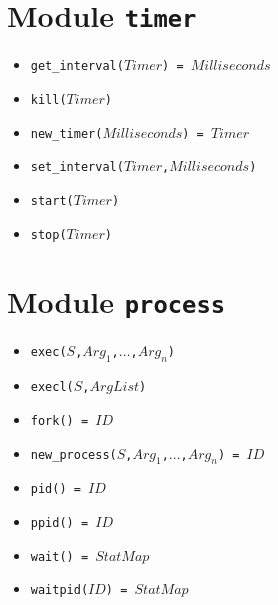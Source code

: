 \documentclass[10pt]{article}
\begin{document}
\begin{multicols}{2}
{\section*{Module \texttt{timer}}
\begin{scriptsize}
\begin{itemize}
    \item \texttt{get\_interval($Timer$) = $Milliseconds$}
    \item \texttt{kill($Timer$)}
    \item \texttt{new\_timer($Milliseconds$) = $Timer$}
    \item \texttt{set\_interval($Timer$,$Milliseconds$)}
    \item \texttt{start($Timer$)}
    \item \texttt{stop($Timer$)}
\end{itemize}
\end{scriptsize}

\section*{Module \texttt{process}}
\begin{scriptsize}
\begin{itemize}
    \item \texttt{exec($S$,$Arg_1$,$\ldots$,$Arg_n$)}
    \item \texttt{execl($S$,$ArgList$)}
    \item \texttt{fork() = $ID$}
    \item \texttt{new\_process($S$,$Arg_1$,$\ldots$,$Arg_n$) = $ID$}
    \item \texttt{pid() = $ID$}
    \item \texttt{ppid() = $ID$}
    \item \texttt{wait() = $StatMap$}
    \item \texttt{waitpid($ID$) = $StatMap$}
\end{itemize}
\end{scriptsize}

}
\end{multicols}
\end{document}
